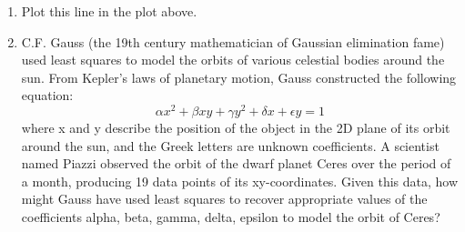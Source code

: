 \begin{enumerate}
\item{
   Plot this line in the plot above.
}

    
\item{
C.F. Gauss (the 19th century mathematician of Gaussian elimination fame) used least squares to model the orbits of various celestial bodies around the sun. From Kepler’s laws of planetary motion, Gauss constructed the following equation:
$$\alpha x^2 + \beta xy + \gamma y^2 + \delta x + \epsilon y = 1$$ where x and y describe the position of the object in the 2D plane of its orbit around the sun, and the Greek letters are unknown coefficients.
A scientist named Piazzi observed the orbit of the dwarf planet Ceres over the period of a month, producing 19 data points of its xy-coordinates. Given this data, how might Gauss have used least squares to recover appropriate values of the coefficients alpha, beta, gamma, delta, epsilon to model the orbit of Ceres?}



\end{enumerate}
